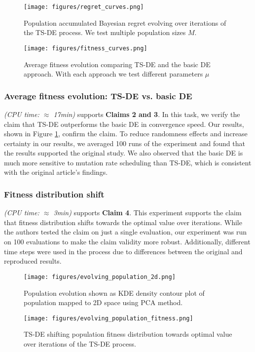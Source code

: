 \begin{figure}
\begin{minipage}[c]{0.48\linewidth}
\texttt{[image: figures/regret\_curves.png]}
\caption{Population accumulated Bayesian regret evolving over iterations of the TS-DE process. We test multiple population sizes $M$.}
\label{regret_curves}
\end{minipage}
\hfill
\begin{minipage}[c]{0.48\linewidth}
\texttt{[image: figures/fitness\_curves.png]}
\caption{Average fitness evolution comparing TS-DE and the basic DE approach. With each approach we test different parameters $\mu$}
\label{fitness_curves}
\end{minipage}%
\end{figure}

\subsubsection{Average fitness evolution: TS-DE vs. basic DE}
\textit{(CPU time: $\approx$ 17min)} supports \textbf{Claims 2 and 3}. In this task, we verify the claim that TS-DE outperforms the basic DE in convergence speed. Our results, shown in Figure \ref{fitness_curves}, confirm the claim. To reduce randomness effects and increase certainty in our results, we averaged 100 runs of the experiment and found that the results supported the original study. We also observed that the basic DE is much more sensitive to mutation rate scheduling than TS-DE, which is consistent with the original article's findings.

\subsubsection{Fitness distribution shift}
\textit{(CPU time: $\approx$ 3min)} supports \textbf{Claim 4}. This experiment supports the claim that fitness distribution shifts towards the optimal value over iterations. While the authors tested the claim on just a single evaluation, our experiment was run on 100 evaluations to make the claim validity more robust. Additionally, different time steps were used in the process due to differences between the original and reproduced results.



\begin{figure}
\begin{minipage}[c]{0.48\linewidth}
\texttt{[image: figures/evolving\_population\_2d.png]}
\caption{Population evolution shown as KDE density contour plot of population mapped to 2D space using PCA method.}
\label{evolving_population_2d}
\end{minipage}
\hfill
\begin{minipage}[c]{0.48\linewidth}
\texttt{[image: figures/evolving\_population\_fitness.png]}
\caption{TS-DE shifting population fitness distribution towards optimal value over iterations of the TS-DE process.}
\label{evolving_population_fitness}
\end{minipage}%
\end{figure}


